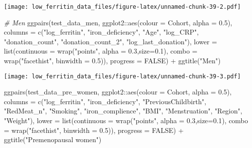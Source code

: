 \documentclass[
]{article}
\newenvironment{Shaded}{\begin{snugshade}}{\end{snugshade}}
\newcommand{\AttributeTok}[1]{\textcolor[rgb]{0.77,0.63,0.00}{#1}}
\newcommand{\CommentTok}[1]{\textcolor[rgb]{0.56,0.35,0.01}{\textit{#1}}}
\newcommand{\ConstantTok}[1]{\textcolor[rgb]{0.00,0.00,0.00}{#1}}
\newcommand{\FloatTok}[1]{\textcolor[rgb]{0.00,0.00,0.81}{#1}}
\newcommand{\FunctionTok}[1]{\textcolor[rgb]{0.00,0.00,0.00}{#1}}
\newcommand{\NormalTok}[1]{#1}
\newcommand{\SpecialCharTok}[1]{\textcolor[rgb]{0.00,0.00,0.00}{#1}}
\newcommand{\StringTok}[1]{\textcolor[rgb]{0.31,0.60,0.02}{#1}}
\begin{document}
\texttt{[image: low\_ferritin\_data\_files/figure-latex/unnamed-chunk-39-2.pdf]}

\begin{Shaded}
\begin{Highlighting}[]
\CommentTok{\# Men}
\FunctionTok{ggpairs}\NormalTok{(test\_data\_men, ggplot2}\SpecialCharTok{::}\FunctionTok{aes}\NormalTok{(}\AttributeTok{colour =}\NormalTok{ Cohort, }\AttributeTok{alpha =} \FloatTok{0.5}\NormalTok{),}
        \AttributeTok{columns =} \FunctionTok{c}\NormalTok{(}\StringTok{"log\_ferritin"}\NormalTok{, }\StringTok{"iron\_deficiency"}\NormalTok{, }\StringTok{"Age"}\NormalTok{, }\StringTok{"log\_CRP"}\NormalTok{,  }\StringTok{"donation\_count"}\NormalTok{, }\StringTok{"donation\_count\_2"}\NormalTok{,}
                    \StringTok{"log\_last\_donation"}\NormalTok{),}
         \AttributeTok{lower =} \FunctionTok{list}\NormalTok{(}\AttributeTok{continuous =} \FunctionTok{wrap}\NormalTok{(}\StringTok{"points"}\NormalTok{, }\AttributeTok{alpha =} \FloatTok{0.3}\NormalTok{,}\AttributeTok{size=}\FloatTok{0.1}\NormalTok{),}
                      \AttributeTok{combo =} \FunctionTok{wrap}\NormalTok{(}\StringTok{"facethist"}\NormalTok{, }\AttributeTok{binwidth =} \FloatTok{0.5}\NormalTok{)),}
        \AttributeTok{progress =} \ConstantTok{FALSE}\NormalTok{) }\SpecialCharTok{+} 
\FunctionTok{ggtitle}\NormalTok{(}\StringTok{"Men"}\NormalTok{)}
\end{Highlighting}
\end{Shaded}

\texttt{[image: low\_ferritin\_data\_files/figure-latex/unnamed-chunk-39-3.pdf]}

\begin{Shaded}
\begin{Highlighting}[]
\FunctionTok{ggpairs}\NormalTok{(test\_data\_pre\_women, ggplot2}\SpecialCharTok{::}\FunctionTok{aes}\NormalTok{(}\AttributeTok{colour =}\NormalTok{ Cohort, }\AttributeTok{alpha =} \FloatTok{0.5}\NormalTok{),}
        \AttributeTok{columns =} \FunctionTok{c}\NormalTok{(}\StringTok{"log\_ferritin"}\NormalTok{, }\StringTok{"iron\_deficiency"}\NormalTok{, }\StringTok{"PreviousChildbirth"}\NormalTok{,  }\StringTok{"RedMeat\_n"}\NormalTok{, }\StringTok{"Smoking"}\NormalTok{, }\StringTok{"iron\_complience"}\NormalTok{, }\StringTok{"BMI"}\NormalTok{, }\StringTok{"Menstruation"}\NormalTok{, }\StringTok{"Region"}\NormalTok{, }\StringTok{"Weight"}\NormalTok{),}
         \AttributeTok{lower =} \FunctionTok{list}\NormalTok{(}\AttributeTok{continuous =} \FunctionTok{wrap}\NormalTok{(}\StringTok{"points"}\NormalTok{, }\AttributeTok{alpha =} \FloatTok{0.3}\NormalTok{,}\AttributeTok{size=}\FloatTok{0.1}\NormalTok{),}
                      \AttributeTok{combo =} \FunctionTok{wrap}\NormalTok{(}\StringTok{"facethist"}\NormalTok{, }\AttributeTok{binwidth =} \FloatTok{0.5}\NormalTok{)),}
        \AttributeTok{progress =} \ConstantTok{FALSE}\NormalTok{) }\SpecialCharTok{+} 
\FunctionTok{ggtitle}\NormalTok{(}\StringTok{"Premenopausal women"}\NormalTok{)}
\end{Highlighting}
\end{Shaded}
\end{document}
